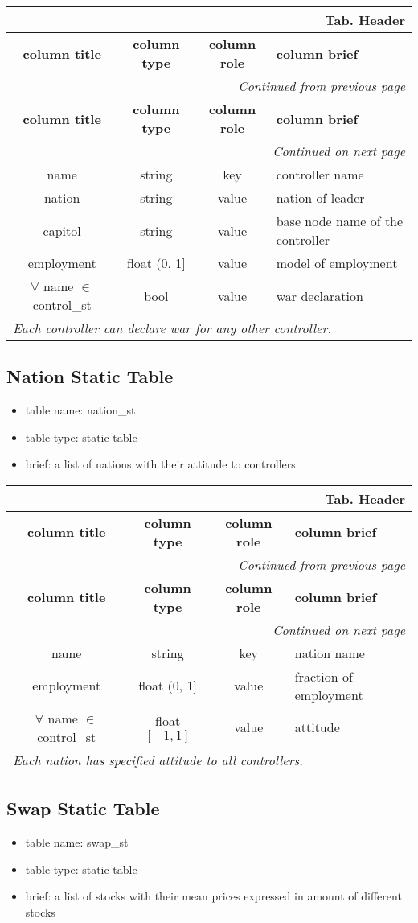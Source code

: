 \documentclass[a4paper,oneside,titlepage]{report}
\newcommand*{\LTHeaderIV}[5]{
  \multicolumn{4}{r}{\textbf{Tab. \thesubsection} \textbf{#1}}\\    
  \hline
  \textbf{#2} & \textbf{#3} & \textbf{#4} & \textbf{#5}\\
  \hline
  
  \endfirsthead
  \multicolumn{4}{r}{\textit{Continued from previous page}}\\    
  \hline
  \textbf{#2} & \textbf{#3} & \textbf{#4} & \textbf{#5}\\
  \hline
  \endhead
  \hline
  \multicolumn{4}{r}{\textit{Continued on next page}}\\
  \endfoot
  \hline
  \endlastfoot  
}
\begin{document}
\vspace{-0.5cm}
\begin{longtable}{ |c|c|c|l| } 
  \LTHeaderIV{Header}{column title}{column type}{column role}{column brief}                    
  name & string & key & controller name\\
  nation & string & value & nation of leader\\
  capitol & string & value & base node name of the controller\\
  employment & float (0, 1] & value & model of employment \\
  $\forall$ name $\in$ control\_st & bool & value & war declaration\\
  \multicolumn{4}{|l|}{\textit{Each controller can declare war for any other controller.}}\\
\end{longtable}        

\subsection{Nation Static Table}
\begin{itemize}
  \setlength{\itemsep}{0pt}
  \setlength{\parskip}{0pt}
\item table name: nation\_st  
\item table type: static table   
\item brief: a list of nations with their attitude to controllers 
\end{itemize}

\vspace{-0.5cm}
\begin{longtable}{ |c|c|c|l| } 
  \LTHeaderIV{Header}{column title}{column type}{column role}{column brief}                    
  name & string & key & nation name\\
  employment & float (0, 1] & value & fraction of employment\\
  $\forall$ name $\in$ control\_st  & float $[-1, 1]$ & value & attitude\\
  \multicolumn{4}{|l|}{\textit{Each nation has specified attitude to all controllers.}}\\
\end{longtable}        


\subsection{Swap Static Table}
\begin{itemize}
  \setlength{\itemsep}{0pt}
  \setlength{\parskip}{0pt}
\item table name: swap\_st  
\item table type: static table   
\item brief: a list of stocks with their mean prices expressed in amount of different stocks 
\end{itemize}
\end{document}
